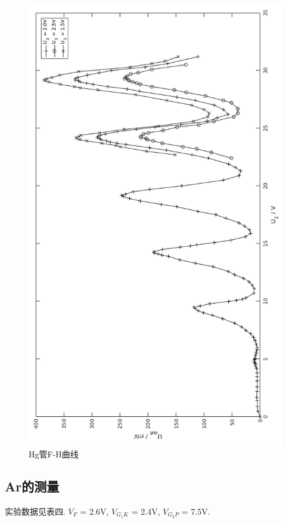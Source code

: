 \documentclass[a4paper,10pt,notitlepage]{article}
\begin{document}
\begin{figure}
	\includegraphics[scale=.7]{fh1.png}
	\caption{Hg管F-H曲线}
\end{figure}

\subsection{Ar的测量}

	实验数据见表四. $V_F$ = 2.6V, $V_{G_1K}$ = 2.4V, $V_{G_2P}$ = 7.5V.
	
\end{document}
